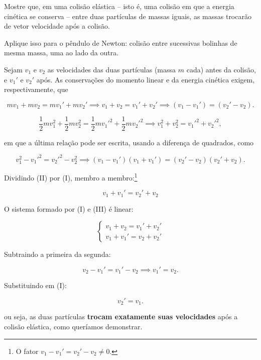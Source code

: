 \begin{exemplo} \label{exemplo_energia_ecineticaex02}

Mostre que, em uma colisão elástica -- isto é, uma colisão em que a energia cinética se conserva -- entre duas partículas de massas iguais, as massas trocarão de vetor velocidade após a colisão.

Aplique isso para o pêndulo de Newton: colisão entre sucessivas bolinhas de mesma massa, uma ao lado da outra.

\resolucao

Sejam $v_1$ e $v_2$ as velocidades das duas partículas
(massa $m$ cada) antes da colisão, e $v_1'$ e $v_2'$ após.
As conservações do momento linear e da energia cinética exigem, respectivamente, que

\[
    mv_1 + mv_2 = mv_1' + mv_2'
    \implies
    v_1 + v_2 = v_1' + v_2' \implies \boxed{(v_1 - v_1') = (v_2' - v_2).}
    \tag{I}
\]

\[
    \frac{1}{2}mv_1^2 + \frac{1}{2}mv_2^2
    = \frac{1}{2}mv_1'^2 + \frac{1}{2}mv_2'^2
    \implies
    v_1^2 + v_2^2 = v_1'^2 + v_2'^2,
\]

\noindent em que a última relação pode ser escrita, usando a diferença de quadrados, como


\[
    v_1^2 - v_1'^2 = v_2'^2 - v_2^2
    \implies
    \boxed{(v_1 - v_1')(v_1 + v_1') = (v_2' - v_2)(v_2' + v_2).}
    \tag{II}
\]

\noindent Dividindo (II) por (I), membro a membro:\footnote{O fator $v_1 - v_1' = v_2' - v_2 \neq 0$.}

\[
    v_1 + v_1' = v_2' + v_2
    \tag{III}
\]

\noindent O sistema formado por (I) e (III) é linear:

\[
    \begin{cases}
        v_1 + v_2 = v_1' + v_2'\\[4pt]
        v_1 + v_1' = v_2 + v_2'
    \end{cases}
\]

\noindent Subtraindo a primeira da segunda:

\[
    v_2 - v_1' = v_1' - v_2
    \implies
    \boxed{v_1' = v_2.} 
\]

\noindent Substituindo em (I):

\[
    \boxed{v_2' = v_1.}
\]

\noindent ou seja, as duas partículas \textbf{trocam exatamente suas
velocidades} após a colisão elástica, como queríamos demonstrar.


\end{exemplo}
